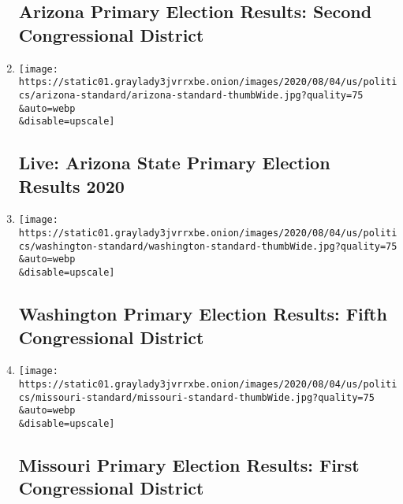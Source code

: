 \begin{enumerate}
  \hypertarget{arizona-primary-election-results-second-congressional-district}{%
  \subsection{Arizona Primary Election Results: Second Congressional
  District}\label{arizona-primary-election-results-second-congressional-district}}
\item
  \href{/interactive/2020/08/04/us/elections/results-arizona-primary-elections.html}{}

  \texttt{[image: https://static01.graylady3jvrrxbe.onion/images/2020/08/04/us/politics/arizona-standard/arizona-standard-thumbWide.jpg?quality=75\\\&auto=webp\\\&disable=upscale]}

  \hypertarget{live-arizona-state-primary-election-results-2020}{%
  \subsection{Live: Arizona State Primary Election Results
  2020}\label{live-arizona-state-primary-election-results-2020}}
\item
  \href{/interactive/2020/08/04/us/elections/results-washington-house-district-5-primary-election.html}{}

  \texttt{[image: https://static01.graylady3jvrrxbe.onion/images/2020/08/04/us/politics/washington-standard/washington-standard-thumbWide.jpg?quality=75\\\&auto=webp\\\&disable=upscale]}

  \hypertarget{washington-primary-election-results-fifth-congressional-district}{%
  \subsection{Washington Primary Election Results: Fifth Congressional
  District}\label{washington-primary-election-results-fifth-congressional-district}}
\item
  \href{/interactive/2020/08/04/us/elections/results-missouri-house-district-1-primary-election.html}{}

  \texttt{[image: https://static01.graylady3jvrrxbe.onion/images/2020/08/04/us/politics/missouri-standard/missouri-standard-thumbWide.jpg?quality=75\\\&auto=webp\\\&disable=upscale]}

  \hypertarget{missouri-primary-election-results-first-congressional-district}{%
  \subsection{Missouri Primary Election Results: First Congressional
  District}\label{missouri-primary-election-results-first-congressional-district}}
\end{enumerate}


